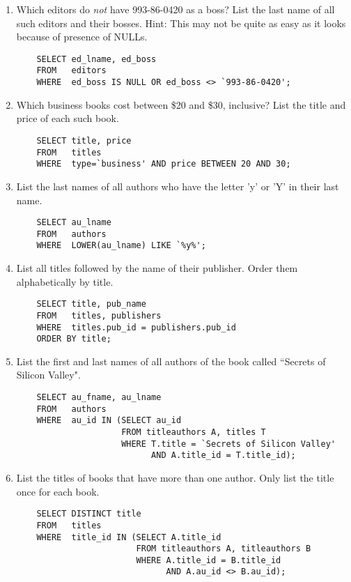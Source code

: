 \documentclass{article}
\begin{document}
\begin{enumerate}
\item Which editors do \textit{not} have 993-86-0420 as a boss? List the last name of all such editors and their bosses. Hint: This may not be quite as easy as it looks because of presence of NULLs.
	\begin{verbatim}
	SELECT ed_lname, ed_boss
	FROM   editors
	WHERE  ed_boss IS NULL OR ed_boss <> `993-86-0420';
	\end{verbatim}

\item Which business books cost between \$20 and \$30, inclusive? List the title and price of each such book.
	\begin{verbatim}
	SELECT title, price
	FROM   titles
	WHERE  type=`business' AND price BETWEEN 20 AND 30;
	\end{verbatim}

\item List the last names of all authors who have the letter 'y' or 'Y' in their last name.
	\begin{verbatim}
	SELECT au_lname
	FROM   authors
	WHERE  LOWER(au_lname) LIKE `%y%';
	\end{verbatim}

\item List all titles followed by the name of their publisher. Order them alphabetically by title.
	\begin{verbatim}
	SELECT title, pub_name
	FROM   titles, publishers
	WHERE  titles.pub_id = publishers.pub_id
	ORDER BY title;
	\end{verbatim}

\item List the first and last names of all authors of the book called ``Secrets of Silicon Valley".
	\begin{verbatim}
	SELECT au_fname, au_lname
	FROM   authors
	WHERE  au_id IN (SELECT au_id
	                 FROM titleauthors A, titles T
	                 WHERE T.title = `Secrets of Silicon Valley' 
	                       AND A.title_id = T.title_id);
	\end{verbatim}

\item List the titles of books that have more than one author. Only list the title once for each book.
	\begin{verbatim}
	SELECT DISTINCT title
	FROM   titles
	WHERE  title_id IN (SELECT A.title_id
	                    FROM titleauthors A, titleauthors B
	                    WHERE A.title_id = B.title_id 
	                          AND A.au_id <> B.au_id);
	\end{verbatim}


\end{enumerate}
\end{document}

